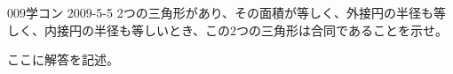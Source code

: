 \begin{prob}{009}{}{学コン 2009-5-5}
 2つの三角形があり、その面積が等しく、外接円の半径も等しく、内接円の半径も等しいとき、この2つの三角形は合同であることを示せ。
\end{prob}
ここに解答を記述。